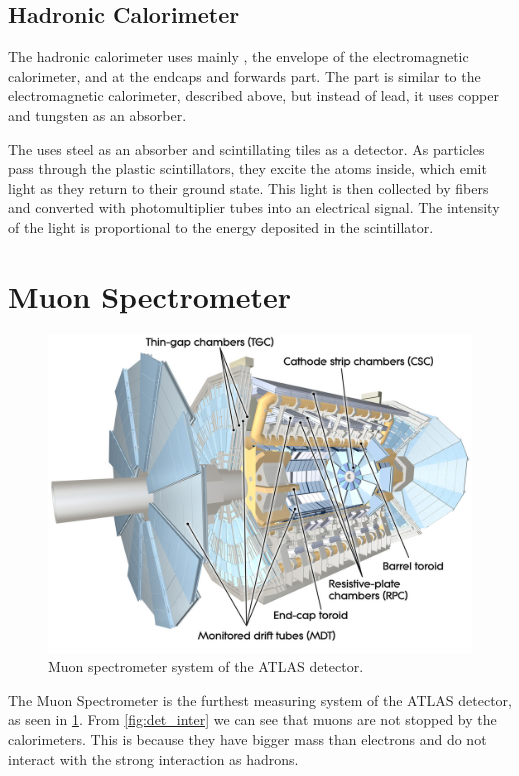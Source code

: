 \subsection{Hadronic Calorimeter}
The hadronic calorimeter uses mainly \TCal, the envelope of the electromagnetic calorimeter, and \LAr at the endcaps and forwards part.
The \LAr part is similar to the electromagnetic calorimeter, described above, but instead of lead, it uses copper and tungsten as an absorber.

The \TCal uses steel as an absorber and scintillating tiles as a detector.
As particles pass through the plastic scintillators, they excite the atoms inside, which emit light as they return to their ground state.
This light is then collected by fibers and converted with photomultiplier tubes into an electrical signal.
The intensity of the light is proportional to the energy deposited in the scintillator.




\section{Muon Spectrometer}
\label{sec:muon}
\begin{figure}[htb]
    \centering
    \includegraphics[width=0.8\linewidth]{src/img/muon.jpg}
    \caption{Muon spectrometer system of the ATLAS detector.}
    \label{fig:muon}
\end{figure}

The Muon Spectrometer is the furthest measuring system of the ATLAS detector, as seen in \cref{fig:muon}.
From \cref{fig:det_inter} we can see that muons are not stopped by the calorimeters.
This is because they have bigger mass than electrons and do not interact with the strong interaction as hadrons.

